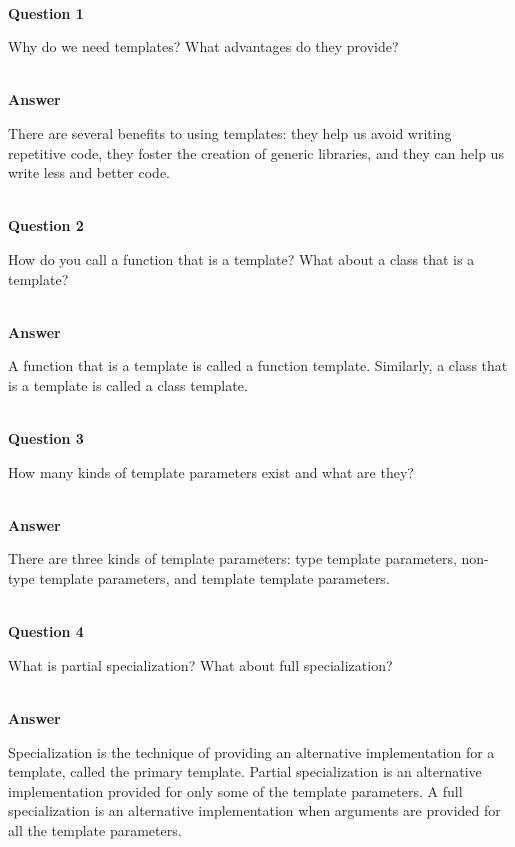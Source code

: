 
\hspace*{\fill} \\ %
\noindent
\textbf{Question 1}

Why do we need templates? What advantages do they provide?

\hspace*{\fill} \\ %
\noindent
\textbf{Answer}

There are several benefits to using templates: they help us avoid writing repetitive code, they foster the creation of generic libraries, and they can help us write less and better code.

\hspace*{\fill} \\ %
\noindent
\textbf{Question 2}

How do you call a function that is a template? What about a class that is a template?

\hspace*{\fill} \\ %
\noindent
\textbf{Answer}

A function that is a template is called a function template. Similarly, a class that is a template is called a class template.

\hspace*{\fill} \\ %
\noindent
\textbf{Question 3}

How many kinds of template parameters exist and what are they?

\hspace*{\fill} \\ %
\noindent
\textbf{Answer}

There are three kinds of template parameters: type template parameters, non-type template parameters, and template template parameters.

\hspace*{\fill} \\ %
\noindent
\textbf{Question 4}

What is partial specialization? What about full specialization?

\hspace*{\fill} \\ %
\noindent
\textbf{Answer}

Specialization is the technique of providing an alternative implementation for a template, called the primary template. Partial specialization is an alternative implementation provided for only some of the template parameters. A full specialization is an alternative implementation when arguments are provided for all the template parameters.

